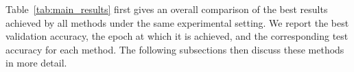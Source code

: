 Table~\ref{tab:main_results} first gives an overall comparison of the best
results achieved by all methods under the same experimental setting. We
report the best validation accuracy, the epoch at which it is achieved,
and the corresponding test accuracy for each method. The following
subsections then discuss these methods in more detail.

% 





